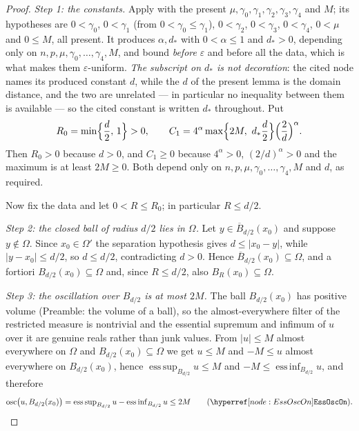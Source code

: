 \begin{proof}
\emph{Step 1: the constants.}  Apply 
with the present $\mu,\gamma_0,\gamma_1,\gamma_2,\gamma_3,\gamma_4$ and $M$; its
hypotheses are $0<\gamma_0$, $0<\gamma_1$ (from $0<\gamma_0\le\gamma_1$),
$0<\gamma_2$, $0<\gamma_3$, $0<\gamma_4$, $0<\mu$ and $0\le M$, all present.  It
produces $\alpha,d_\ast$ with $0<\alpha\le1$ and $d_\ast>0$, depending only on
$n,p,\mu,\gamma_0,\dots,\gamma_4,M$, and bound \emph{before} $\varepsilon$ and
before all the data, which is what makes them $\varepsilon$-uniform.
\emph{The subscript on $d_\ast$ is not decoration}: the cited node names its
produced constant $d$, while the $d$ of the present lemma is the domain
distance, and the two are unrelated --- in particular no inequality between
them is available --- so the cited constant is written $d_\ast$ throughout.  Put
\[
R_0=\min\Bigl\{\frac d2,\,1\Bigr\}>0,
\qquad
C_1=4^{\alpha}\max\Bigl\{2M,\ d_\ast\frac d2\Bigr\}\Bigl(\frac2d\Bigr)^{\alpha} .
\]
Then $R_0>0$ because $d>0$, and $C_1\ge0$ because $4^{\alpha}>0$,
$(2/d)^{\alpha}>0$ and the maximum is at least $2M\ge0$.  Both depend only on
$n,p,\mu,\gamma_0,\dots,\gamma_4,M$ and $d$, as required.

Now fix the data and let $0<R\le R_0$; in particular $R\le d/2$.

\emph{Step 2: the closed ball of radius $d/2$ lies in $\Omega$.}  Let
$y\in\overline B_{d/2}(x_0)$ and suppose $y\notin\Omega$.  Since $x_0\in\Omega'$
the separation hypothesis gives $d\le|x_0-y|$, while $|y-x_0|\le d/2$, so
$d\le d/2$, contradicting $d>0$.  Hence $\overline B_{d/2}(x_0)\subseteq\Omega$,
and a fortiori $B_{d/2}(x_0)\subseteq\Omega$ and, since $R\le d/2$, also
$B_R(x_0)\subseteq\Omega$.

\emph{Step 3: the oscillation over $B_{d/2}$ is at most $2M$.}  The ball
$B_{d/2}(x_0)$ has positive volume (Preamble: the volume of a ball), so the
almost-everywhere filter of the restricted measure is nontrivial and the
essential supremum and infimum of $u$ over it are genuine reals rather than
junk values.  From $|u|\le M$ almost everywhere on $\Omega$ and
$B_{d/2}(x_0)\subseteq\Omega$ we get $u\le M$ and $-M\le u$ almost everywhere
on $B_{d/2}(x_0)$, hence
$\operatorname{ess\,sup}_{B_{d/2}}u\le M$ and
$-M\le\operatorname{ess\,inf}_{B_{d/2}}u$, and therefore
\[
\operatorname*{osc}\bigl(u,B_{d/2}(x_0)\bigr)
=\operatorname{ess\,sup}_{B_{d/2}}u-\operatorname{ess\,inf}_{B_{d/2}}u\le2M
\qquad(\noderef{EssOscOn}).
\]


\end{proof}
